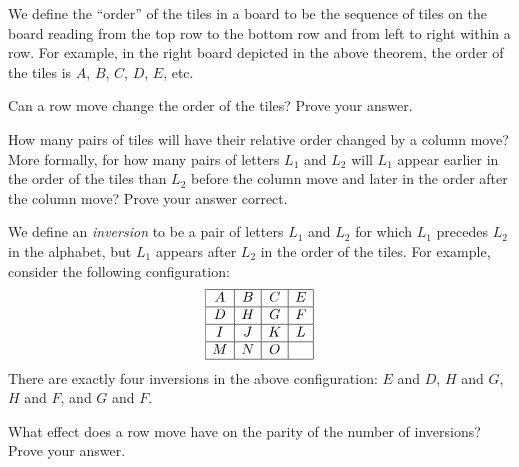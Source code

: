\documentclass[twoside,12pt]{article}
\begin{document}
\begin{problem}{20}
\bparts

We define the ``order'' of the tiles in a board to be the sequence of tiles on the board reading from the top row to the bottom row and from left to right within a row.  For example, in the right board depicted in the above theorem, the order of the tiles is $A$, $B$, $C$, $D$, $E$, etc.

Can a row move change the order of the tiles?  Prove your answer.


How many pairs of tiles will have their relative order changed by a column move?  More formally, for how many pairs of letters $L_1$ and $L_2$ will $L_1$ appear earlier in the order of the tiles than $L_2$ before the column move and later in the order after the column move?  Prove your answer correct.


We define an \emph{inversion} to be a pair of letters $L_1$ and $L_2$ for which $L_1$ precedes $L_2$ in the alphabet, but $L_1$ appears after $L_2$ in the order of the tiles.  For example, consider the following configuration:
\[
\begin{array}{|c|c|c|c|}
\hline
A & B & C & E \\ \hline
D & H & G & F \\ \hline
I & J & K & L \\ \hline
M & N & O &  \\ \hline
\end{array}
\]
There are exactly four inversions in the above configuration: $E$ and $D$, $H$ and $G$, $H$ and $F$, and $G$ and $F$.

What effect does a row move have on the parity of the number of inversions?  Prove your answer.



\end{problem}
\end{document}
